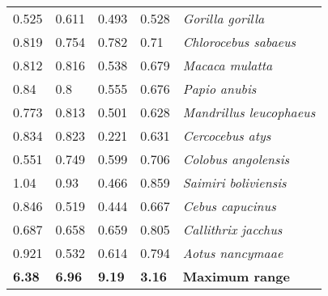 \begin{tabular}{lllll}
          0.525 &           0.611 &           0.493 &           0.528 &                      \textit{Gorilla gorilla} \\
          0.819 &           0.754 &           0.782 &            0.71 &                  \textit{Chlorocebus sabaeus} \\
          0.812 &           0.816 &           0.538 &           0.679 &                       \textit{Macaca mulatta} \\
           0.84 &             0.8 &           0.555 &           0.676 &                         \textit{Papio anubis} \\
          0.773 &           0.813 &           0.501 &           0.628 &               \textit{Mandrillus leucophaeus} \\
          0.834 &           0.823 &           0.221 &           0.631 &                      \textit{Cercocebus atys} \\
          0.551 &           0.749 &           0.599 &           0.706 &                   \textit{Colobus angolensis} \\
           1.04 &            0.93 &           0.466 &           0.859 &                  \textit{Saimiri boliviensis} \\
          0.846 &           0.519 &           0.444 &           0.667 &                      \textit{Cebus capucinus} \\
          0.687 &           0.658 &           0.659 &           0.805 &                   \textit{Callithrix jacchus} \\
          0.921 &           0.532 &           0.614 &           0.794 &                      \textit{Aotus nancymaae} \\
 \textbf{ 6.38} &  \textbf{ 6.96} &  \textbf{ 9.19} &  \textbf{ 3.16} &                        \textbf{Maximum range} \\
\bottomrule
\end{tabular}
